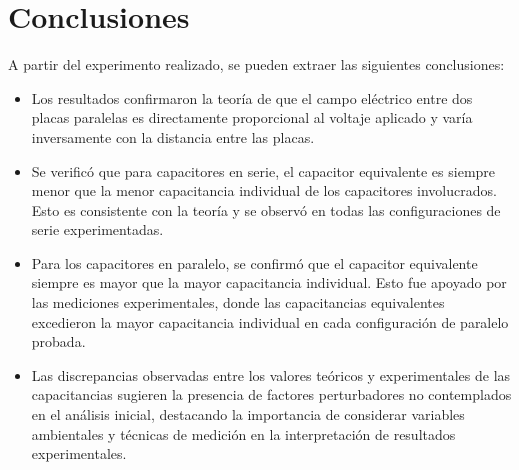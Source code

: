 \section{Conclusiones}
A partir del experimento realizado, se pueden extraer las siguientes conclusiones:
\begin{itemize}
    \item Los resultados confirmaron la teoría de que el campo eléctrico entre dos placas paralelas es directamente proporcional al voltaje aplicado y varía inversamente con la distancia entre las placas.
    \item Se verificó que para capacitores en serie, el capacitor equivalente es siempre menor que la menor capacitancia individual de los capacitores involucrados. Esto es consistente con la teoría y se observó en todas las configuraciones de serie experimentadas.
    \item Para los capacitores en paralelo, se confirmó que el capacitor equivalente siempre es mayor que la mayor capacitancia individual. Esto fue apoyado por las mediciones experimentales, donde las capacitancias equivalentes excedieron la mayor capacitancia individual en cada configuración de paralelo probada.
    \item Las discrepancias observadas entre los valores teóricos y experimentales de las capacitancias sugieren la presencia de factores perturbadores no contemplados en el análisis inicial, destacando la importancia de considerar variables ambientales y técnicas de medición en la interpretación de resultados experimentales.
\end{itemize}